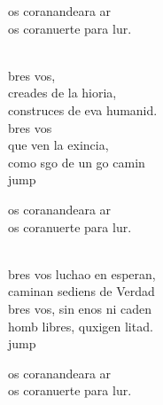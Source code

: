 \begin{cancion}%
	\begin{chorus}%
	os coranandeara ar\\
	os coranuerte para lur.\\
	\end{chorus}%
	\jump\\
	bres vos, \\
	creades de la hioria,\\
	construces de eva humanid.\\
	bres vos \\
	que ven la exincia,\\
	como sgo de un go camin\\jump\\
	\begin{chorus}%
	os coranandeara ar\\
	os coranuerte para lur.\\
	\end{chorus}%
	\jump\\
	bres vos luchao en esperan,\\
	caminan sediens de Verdad\\
	bres vos, sin enos ni caden\\
	homb libres, quxigen litad.\\jump\\
	\begin{chorus}%
	os coranandeara ar\\
	os coranuerte para lur.\\

\end{chorus}
\end{cancion}
